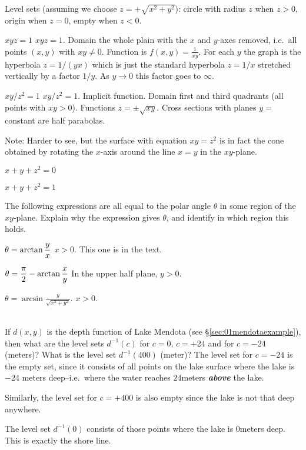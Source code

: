 \begin{multicols}{2}
Level sets (assuming we choose $z=+\sqrt{x^2+y^2}$):  circle with radius
$z$ when $z>0$, origin when $z=0$, empty when $z<0$.
\endanswer

\subprob $xyz=1$
\answer
$xyz=1$.
Domain the whole plain with the $x$ and $y$-axes removed, i.e.\ all
points $(x, y)$ with $xy\ne0$.
Function is $f(x, y) = \frac{1} {xy}$.
For each $y$ the graph is the hyperbola $z=1/(yx)$ which is just the
standard hyperbola $z=1/x$ stretched vertically by a factor $1/y$.
As $y\to 0$ this factor goes to $\infty$.
\endanswer

\subprob $xy/z^2=1$
\answer
$xy/z^2=1$.
Implicit function.
Domain first and third quadrants (all points with $xy>0$).
Functions $z= \pm \sqrt{xy}$.
Cross sections with planes $y=$constant are half parabolas.

Note: Harder to see, but the surface with equation $xy=z^2$ is in fact
the cone obtained by rotating the $x$-axis around the line
$x=y$ in the $xy$-plane.
\endanswer

\subprob $x+y+z^2=0$

\subprob $x+y+z^2=1$

\problem\label{prb:polar-angle-formula} 
The following expressions are all equal to the polar angle $\theta$ in some region of
the $xy$-plane.  Explain why the expression gives $\theta$, and identify in which
region this holds.

\subprob $\displaystyle \theta = \arctan \frac{y}{x}$
\answer
$x>0$.  This one is in the text.
\endanswer

\subprob $\displaystyle \theta = \frac\pi2 - \arctan \frac{x}{y}$
\answer
In the upper half plane, $y>0$.
\endanswer

\subprob $\theta=\arcsin \frac{y}{\sqrt{x^2+y^2}}$.
\answer
$x>0$.  
\endanswer

\\ 
If $d(x, y)$ is the depth function of Lake Mendota (see
\S\ref{sec:01mendotaexample}), then what are the level sets $d^{-1}(c)$
for $c=0$, $c=+24$ and for $c=-24$ (meters)?  What is the level
set $d^{-1}(400)$ (meter)?
\answer 
The level set for $c=-24$ is the empty set, since it consists of all points on
the lake surface where the lake is $-24$ meters deep--i.e.~where the water
reaches $24$meters {\bfseries\itshape above} the lake.    

Similarly, the level set for $c=+400$ is also empty since the lake is not that
deep anywhere.

The level set $d^{-1}(0)$ consists of those points where the lake is $0$meters
deep.  This is exactly the shore line.


\end{multicols}
